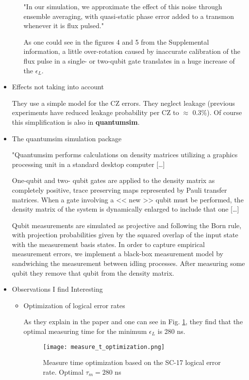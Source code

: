 \begin{itemize}
\begin{itemize}
"In our simulation, we approximate the effect of this noise through ensemble averaging, with quasi-static phase error added to a transmon whenever it is flux pulsed."

As one could see in the figures 4 and 5 from the Supplemental information, a little over-rotation  caused by inaccurate calibration of the flux pulse in a single- or two-qubit gate translates in a huge increase of the \(\epsilon_L\).
\end{itemize}


\item Effects not taking into account
\label{sec:orgb18faca}

They use a simple model for the CZ errors.
They neglect leakage (previous experiments have reduced leakage probability per CZ to \(\approx\) 0.3\%).
Of course this simplification is also in \textbf{quantumsim}.

\item The quantumsim simulation package
\label{sec:orga7e9943}

"Quantumsim performs calculations on density matrices utilizing a graphics processing unit in a standard desktop computer [\ldots{}]

One-qubit and two- qubit gates are applied to the density matrix as completely positive, trace preserving maps represented by Pauli transfer matrices. When a gate involving a << new >> qubit must be performed, the density matrix of the system is dynamically enlarged to include that one [\ldots{}]

Qubit measurements are simulated as projective and following the Born rule, with projection probabilities given by the squared overlap of the input state with the measurement basis states. In order to capture empirical measurement errors, we implement a black-box measurement model by sandwiching the measurement between idling processes. After measuring some qubit they remove that qubit from the density matrix.


\item Observations I find Interesting
\label{sec:org6d9caf3}
\begin{itemize}
\item Optimization of logical error rates
\label{sec:org0901305}

As they explain in the paper and one can see in Fig. \ref{fig:org00241a5}, they find that the optimal measuring time for the minimum \(\epsilon_L\) is 280 ns.

\begin{figure}[htbp]
\centering
\texttt{[image: measure\_t\_optimization.png]}
\caption{\label{fig:org00241a5}
Measure time optimization based on the SC-17 logical error rate. Optimal \(\tau_m = 280\) ns}
\end{figure}



\end{itemize}
\end{itemize}
